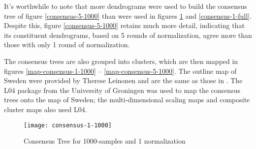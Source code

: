 It's worthwhile to note that more dendrograms were used to build
the consensus tree of figure \ref{consensus-5-1000} than were used in
figures \ref{consensus-1-1000} and \ref{consensus-1-full}. Despite this, figure
\ref{consensus-5-1000} retains much more detail, indicating that its
constituent dendrograms, based on 5 rounds of normalization,
agree more than those with only 1 round of normalization.

The consensus trees are also grouped into clusters, which are then
mapped in figures \ref{map-consensus-1-1000} --
\ref{map-consensus-5-1000}. The outline map of Sweden were provided by
Therese Leinonen and are the same as those in . The
L04 package from the University of Groningen was used to map the
consensus trees onto the map of Sweden; the multi-dimensional scaling
maps and composite cluster maps also used L04.


\begin{figure}
\texttt{[image: consensus-1-1000]}
\caption{Consensus Tree for 1000-samples and 1 normalization}
\label{consensus-1-1000}
\end{figure}

